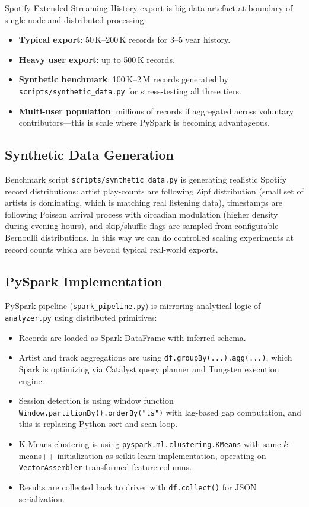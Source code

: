 \documentclass[conference]{IEEEtran}
\begin{document}
Spotify Extended Streaming History export is big data artefact at boundary of single-node and distributed processing:
\begin{itemize}
  \item \textbf{Typical export}: 50\,K--200\,K records for 3--5 year history.
  \item \textbf{Heavy user export}: up to 500\,K records.
  \item \textbf{Synthetic benchmark}: 100\,K--2\,M records generated by
        \texttt{scripts/synthetic\_data.py} for stress-testing all three tiers.
  \item \textbf{Multi-user population}: millions of records if aggregated across
        voluntary contributors---this is scale where PySpark is becoming advantageous.
\end{itemize}

\subsection{Synthetic Data Generation}

Benchmark script \texttt{scripts/synthetic\_data.py} is generating realistic Spotify record distributions: artist play-counts are following Zipf distribution (small set of artists is dominating, which is matching real listening data), timestamps are following Poisson arrival process with circadian modulation (higher density during evening hours), and skip/shuffle flags are sampled from configurable Bernoulli distributions. In this way we can do controlled scaling experiments at record counts which are beyond typical real-world exports.

\subsection{PySpark Implementation}

PySpark pipeline (\texttt{spark\_pipeline.py}) is mirroring analytical logic of \texttt{analyzer.py} using distributed primitives:

\begin{itemize}
  \item Records are loaded as Spark DataFrame with inferred schema.
  \item Artist and track aggregations are using \texttt{df.groupBy(...).agg(...)},
        which Spark is optimizing via Catalyst query planner and Tungsten
        execution engine.
  \item Session detection is using window function
        \texttt{Window.partitionBy().orderBy("ts")} with lag-based gap
        computation, and this is replacing Python sort-and-scan loop.
  \item K-Means clustering is using \texttt{pyspark.ml.clustering.KMeans} with
        same $k$-means++ initialization as scikit-learn implementation,
        operating on \texttt{VectorAssembler}-transformed feature columns.
  \item Results are collected back to driver with \texttt{df.collect()}
        for JSON serialization.
\end{itemize}
\end{document}
